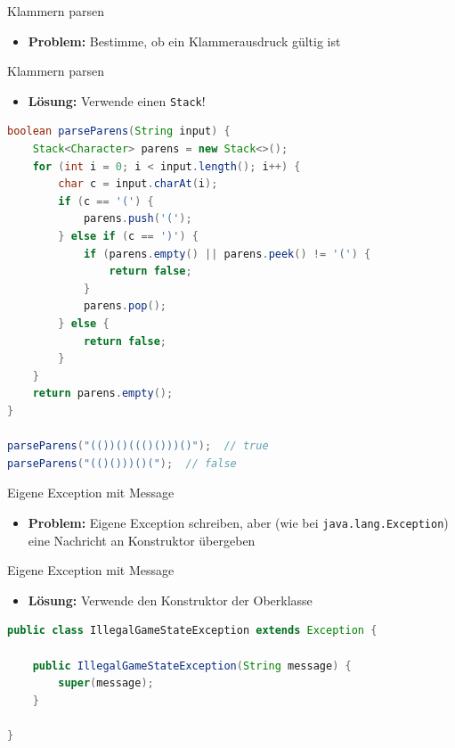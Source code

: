 \documentclass[18pt]{beamer}
\begin{document}
\begin{frame}[fragile]{Klammern parsen}
    \begin{itemize}
        \item \textbf{Problem:} Bestimme, ob ein Klammerausdruck gültig ist
    \end{itemize}
\end{frame}

\begin{frame}[fragile]{Klammern parsen}
    \begin{itemize}
        \item \textbf{Lösung:} Verwende einen \texttt{Stack}!
    \end{itemize}

    \begin{lstlisting}[language=Java,basicstyle=\scriptsize]
boolean parseParens(String input) {
    Stack<Character> parens = new Stack<>();
    for (int i = 0; i < input.length(); i++) {
        char c = input.charAt(i);
        if (c == '(') {
            parens.push('(');
        } else if (c == ')') {
            if (parens.empty() || parens.peek() != '(') {
                return false;
            }
            parens.pop();
        } else {
            return false;
        }
    }
    return parens.empty();
}

parseParens("(())()((()()))()");  // true
parseParens("(()()))()(");  // false
    \end{lstlisting}
\end{frame}

\begin{frame}{Eigene Exception mit Message}
    \begin{itemize}
        \item \textbf{Problem:} Eigene Exception schreiben, aber (wie bei \texttt{java.lang.Exception}) eine Nachricht an Konstruktor übergeben
    \end{itemize}
\end{frame}

\begin{frame}[fragile]{Eigene Exception mit Message}
    \begin{itemize}
        \item \textbf{Lösung:} Verwende den Konstruktor der Oberklasse
    \end{itemize}

\begin{block}{}
    \begin{lstlisting}[language=Java,basicstyle=\scriptsize]
public class IllegalGameStateException extends Exception {

    public IllegalGameStateException(String message) {
        super(message);
    }

}
    \end{lstlisting}
\end{block}


\end{frame}
\end{document}
